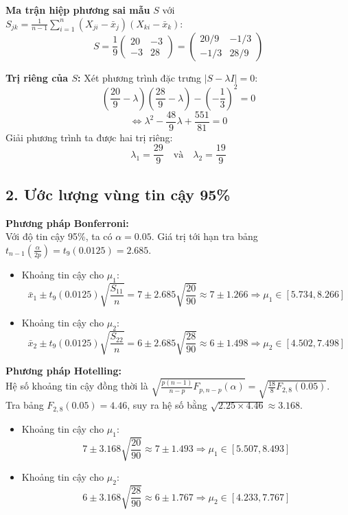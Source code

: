 \documentclass[12pt, a4paper]{article}
\begin{document}
\textbf{Ma trận hiệp phương sai mẫu} $S$ với $S_{jk} = \frac{1}{n-1} \sum_{i=1}^n (X_{ji} - \bar{x}_j)(X_{ki} - \bar{x}_k)$:
\[ S = \frac{1}{9} \begin{pmatrix} 20 & -3 \\ -3 & 28 \end{pmatrix} = \begin{pmatrix} 20/9 & -1/3 \\ -1/3 & 28/9 \end{pmatrix} \]

\textbf{Trị riêng của $S$:} Xét phương trình đặc trưng $|S - \lambda I| = 0$:
\[ \left( \frac{20}{9} - \lambda \right) \left( \frac{28}{9} - \lambda \right) - \left( -\frac{1}{3} \right)^2 = 0 \]
\[ \Leftrightarrow \lambda^2 - \frac{48}{9}\lambda + \frac{551}{81} = 0 \]
Giải phương trình ta được hai trị riêng: 
\[ \lambda_1 = \frac{29}{9} \quad \text{và} \quad \lambda_2 = \frac{19}{9} \]

\subsection*{2. Ước lượng vùng tin cậy 95\%}

\textbf{Phương pháp Bonferroni:} \\
Với độ tin cậy 95\%, ta có $\alpha = 0.05$. Giá trị tới hạn tra bảng $t_{n-1}\left(\frac{\alpha}{2p}\right) = t_9(0.0125) = 2.685$.
\begin{itemize}
    \item Khoảng tin cậy cho $\mu_1$:
    \[ \bar{x}_1 \pm t_9(0.0125)\sqrt{\frac{S_{11}}{n}} = 7 \pm 2.685\sqrt{\frac{20}{90}} \approx 7 \pm 1.266 \Rightarrow \mu_1 \in [5.734, 8.266] \]
    \item Khoảng tin cậy cho $\mu_2$:
    \[ \bar{x}_2 \pm t_9(0.0125)\sqrt{\frac{S_{22}}{n}} = 6 \pm 2.685\sqrt{\frac{28}{90}} \approx 6 \pm 1.498 \Rightarrow \mu_2 \in [4.502, 7.498] \]
\end{itemize}

\textbf{Phương pháp Hotelling:} \\
Hệ số khoảng tin cậy đồng thời là $\sqrt{\frac{p(n-1)}{n-p} F_{p, n-p}(\alpha)} = \sqrt{\frac{18}{8} F_{2, 8}(0.05)}$. \\
Tra bảng $F_{2, 8}(0.05) = 4.46$, suy ra hệ số bằng $\sqrt{2.25 \times 4.46} \approx 3.168$.
\begin{itemize}
    \item Khoảng tin cậy cho $\mu_1$:
    \[ 7 \pm 3.168\sqrt{\frac{20}{90}} \approx 7 \pm 1.493 \Rightarrow \mu_1 \in [5.507, 8.493] \]
    \item Khoảng tin cậy cho $\mu_2$:
    \[ 6 \pm 3.168\sqrt{\frac{28}{90}} \approx 6 \pm 1.767 \Rightarrow \mu_2 \in [4.233, 7.767] \]
\end{itemize}
\end{document}
